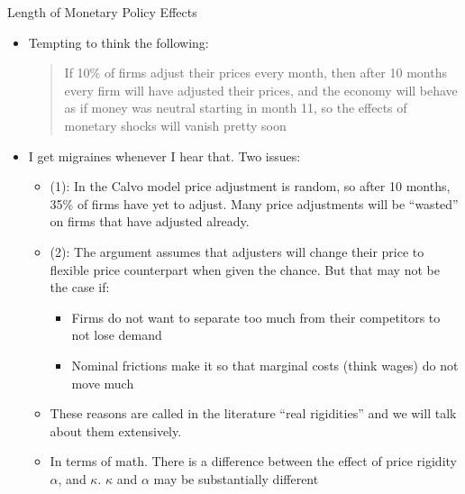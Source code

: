 \documentclass[11pt,aspectratio=169,xcolor={dvipsnames},hyperref={pdftex,pdfpagemode=UseNone,hidelinks,pdfdisplaydoctitle=true},usepdftitle=false]{beamer}
\begin{document}
\begin{frame}{Length of Monetary Policy Effects}
\begin{itemize}
\item Tempting to think the following:
\begin{quote}
If 10\% of firms adjust their prices every month, then after 10 months every firm will have adjusted their prices, and the economy will behave as if money was neutral starting in month 11, so the effects of monetary shocks will vanish pretty soon
\end{quote}
\item I get migraines whenever I hear that. Two issues:
\begin{itemize}
\item (1): In the Calvo model price adjustment is random, so after 10 months, 35\% of firms have yet to adjust. Many price adjustments will be ``wasted'' on firms that have adjusted already.
\item (2): The argument assumes that adjusters will change their price to flexible price counterpart when given the chance. But that may not be the case if:
\begin{itemize}
\item Firms do not want to separate too much from their competitors to not lose demand
\item Nominal frictions make it so that marginal costs (think wages) do not move much
\end{itemize}
\item These reasons are called in the literature ``real rigidities'' and we will talk about them extensively.
\item In terms of math. There is a difference between the effect of price rigidity $\alpha$, and $\kappa$. $\kappa$ and $\alpha$ may be substantially different
\end{itemize}
\end{itemize}
\end{frame}
\end{document}
